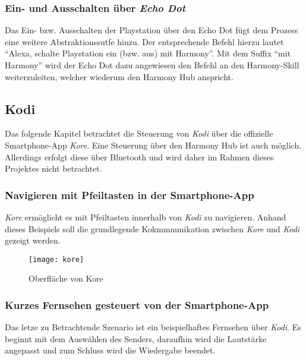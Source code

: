 \subsubsection{Ein- und Ausschalten über \textit{Echo Dot}}
Das Ein- bzw. Ausschalten der Playstation über den Echo Dot fügt dem Prozess eine weitere Abstraktionssutfe hinzu.
Der entsprechende Befehl hierzu lautet \enquote{Alexa, schalte Playstation ein (bzw. aus) mit Harmony}.
Mit dem Suffix \enquote{mit Harmony} wird der Echo Dot dazu angewiesen den Befehl an den Harmony-Skill weiterzuleiten,
welcher wiederum den Harmony Hub anspricht.


\subsection{Kodi}

Das folgende Kapitel betrachtet die Steuerung von \textit{Kodi} über die offizielle Smartphone-App \textit{Kore}.
Eine Steuerung über den Harmony Hub ist auch möglich.
Allerdings erfolgt diese über Bluetooth und wird daher im Rahmen dieses Projektes nicht betrachtet.

\subsubsection{Navigieren mit Pfeiltasten in der Smartphone-App}
\textit{Kore} ermöglicht es mit Pfeiltasten innerhalb von \textit{Kodi} zu navigieren.
Anhand dieses Beispiels soll die grundlegende Kokmmnunikation zwischen \textit{Kore} und \textit{Kodi} gezeigt werden.

\begin{figure}[h!]
    \centering
    \texttt{[image: kore]}
    \caption{Oberfläche von Kore}\label{fig:kore}
\end{figure}


\subsubsection{Kurzes Fernsehen gesteuert von der Smartphone-App}
Das letze zu Betrachtende Szenario ist ein beispielhaftes Fernsehen über \textit{Kodi}.
Es beginnt mit dem Auswählen des Senders,
daraufhin wird die Lautstärke angepasst und zum Schluss wird die Wiedergabe beendet.